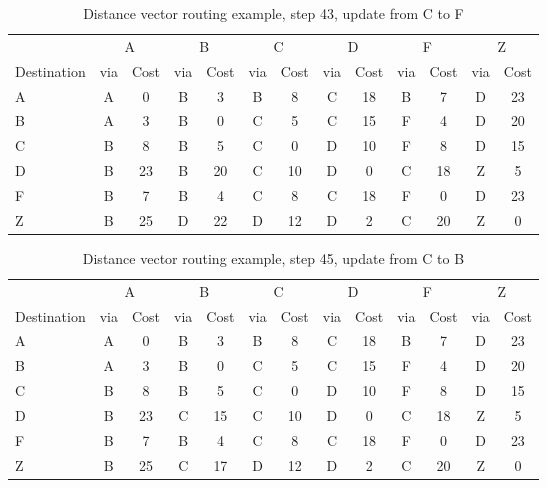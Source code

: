 \begin{table}
    \caption{Distance vector  routing example, step 43, update from C to F }
    \label{tab:dv:step:43}
\begin{tabular}{l|c|c|c|c|c|c|c|c|c|c|c|c}
    \toprule
      & \multicolumn{2}{c|}{A}&\multicolumn{2}{c|}{B}&\multicolumn{2}{c|}{C}&\multicolumn{2}{c|}{D}&\multicolumn{2}{c|}{F}&\multicolumn{2}{c|}{Z} \\
    Destination & via&Cost&via&Cost&via&Cost&via&Cost&via&Cost&via&Cost \\ 
    \midrule
    A & A & 0 &B & 3 &B & 8 &C & 18 &B & 7 &D & 23 
 \\B & A & 3 &B & 0 &C & 5 &C & 15 &F & 4 &D & 20 
 \\C & B & 8 &B & 5 &C & 0 &D & 10 &F & 8 &D & 15 
 \\D & B & 23 &B & 20 &C & 10 &D & 0 &C & 18 &Z & 5 
 \\F & B & 7 &B & 4 &C & 8 &C & 18 &F & 0 &D & 23 
 \\Z & B & 25 &D & 22 &D & 12 &D & 2 &C & 20 &Z & 0 
    \\ \bottomrule 
\end{tabular}
\end{table}
    

\begin{table}
    \caption{Distance vector  routing example, step 45, update from C to B }
    \label{tab:dv:step:45}
\begin{tabular}{l|c|c|c|c|c|c|c|c|c|c|c|c}
    \toprule
      & \multicolumn{2}{c|}{A}&\multicolumn{2}{c|}{B}&\multicolumn{2}{c|}{C}&\multicolumn{2}{c|}{D}&\multicolumn{2}{c|}{F}&\multicolumn{2}{c|}{Z} \\
    Destination & via&Cost&via&Cost&via&Cost&via&Cost&via&Cost&via&Cost \\ 
    \midrule
    A & A & 0 &B & 3 &B & 8 &C & 18 &B & 7 &D & 23 
 \\B & A & 3 &B & 0 &C & 5 &C & 15 &F & 4 &D & 20 
 \\C & B & 8 &B & 5 &C & 0 &D & 10 &F & 8 &D & 15 
 \\D & B & 23 &C & 15 &C & 10 &D & 0 &C & 18 &Z & 5 
 \\F & B & 7 &B & 4 &C & 8 &C & 18 &F & 0 &D & 23 
 \\Z & B & 25 &C & 17 &D & 12 &D & 2 &C & 20 &Z & 0 
    \\ \bottomrule 
\end{tabular}
\end{table}
    

